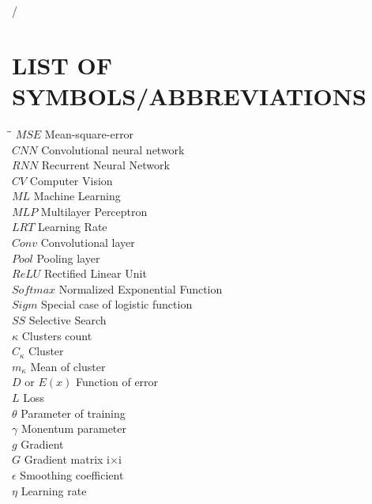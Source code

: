 \newpage
\newenvironment{symbols}{%
	\clearpage
	\chapter*{\listsymbolname}
	\beginsymlist}
{\closesymlist}
%
\newcommand{\beginsymlist}{%
	\begin{tabbing}
		\hspace*{\symtabi}\=\hspace*{\symtabii}\=\kill}
	\newcommand{\closesymlist}{\end{tabbing}}
%
\newcommand{\sym}[2]{\>#1 \>#2 \\}
\newlength{\symtabi}
\newlength{\symtabii}
\setlength{\symtabi}{1em}
\setlength{\symtabii}{5em}
\newcommand{\listsymbolname}{LIST OF SYMBOLS/ABBREVIATIONS}/

\begin{symbols}
	\sym{$ MSE $}{Mean-square-error}
	\sym{$CNN$ }{Convolutional neural network}
	\sym{$RNN $}{Recurrent Neural Network}
	\sym{$CV$ }{Computer Vision}
	\sym{$ML$ }{Machine Learning}
	\sym{$MLP$ }{Multilayer Perceptron}
	\sym{$LRT$ }{Learning Rate}
	\sym{$Conv$ }{Convolutional layer}
	\sym{$Pool$ }{Pooling layer}
	\sym{$ReLU$ }{Rectified Linear Unit}
	\sym{$Softmax$ }{Normalized Exponential Function}
	\sym{$Sigm$ }{Special case of logistic function}
	\sym{$SS$ }{Selective Search}
	\sym{$\kappa$}{Clusters count}
	\sym{$C_{\kappa}$}{Cluster}
	\sym{$m_{\kappa}$}{Mean of cluster}
	\sym{$D$ or $E\left( x \right) $}{Function of error}
	\sym{$L$}{Loss}
	\sym{$\theta$}{Parameter of training}
	\sym{$\gamma$}{Monentum parameter}
	\sym{$g$}{Gradient}
	\sym{$G$}{Gradient matrix i$\times$i}
	\sym{$\epsilon$}{Smoothing coefficient}
	\sym{$\eta$}{Learning rate}
\end{symbols}
